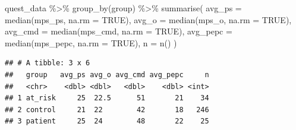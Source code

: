 \documentclass[
]{article}
\newenvironment{Shaded}{\begin{snugshade}}{\end{snugshade}}
\newcommand{\AttributeTok}[1]{\textcolor[rgb]{0.77,0.63,0.00}{#1}}
\newcommand{\ConstantTok}[1]{\textcolor[rgb]{0.00,0.00,0.00}{#1}}
\newcommand{\FunctionTok}[1]{\textcolor[rgb]{0.00,0.00,0.00}{#1}}
\newcommand{\NormalTok}[1]{#1}
\newcommand{\OtherTok}[1]{\textcolor[rgb]{0.56,0.35,0.01}{#1}}
\newcommand{\SpecialCharTok}[1]{\textcolor[rgb]{0.00,0.00,0.00}{#1}}
\newcommand{\StringTok}[1]{\textcolor[rgb]{0.31,0.60,0.02}{#1}}
\begin{document}
\begin{Shaded}
\begin{Highlighting}[]
\NormalTok{quest\_data }\SpecialCharTok{\%\textgreater{}\%} 
  \FunctionTok{group\_by}\NormalTok{(group) }\SpecialCharTok{\%\textgreater{}\%} 
  \FunctionTok{summarise}\NormalTok{(}
    \AttributeTok{avg\_ps =} \FunctionTok{median}\NormalTok{(mps\_ps, }\AttributeTok{na.rm =} \ConstantTok{TRUE}\NormalTok{), }
    \AttributeTok{avg\_o  =} \FunctionTok{median}\NormalTok{(mps\_o, }\AttributeTok{na.rm =} \ConstantTok{TRUE}\NormalTok{), }
    \AttributeTok{avg\_cmd  =} \FunctionTok{median}\NormalTok{(mps\_cmd, }\AttributeTok{na.rm =} \ConstantTok{TRUE}\NormalTok{),}
    \AttributeTok{avg\_pepc  =} \FunctionTok{median}\NormalTok{(mps\_pepc, }\AttributeTok{na.rm =} \ConstantTok{TRUE}\NormalTok{),}
    \AttributeTok{n =} \FunctionTok{n}\NormalTok{()}
\NormalTok{  )}
\end{Highlighting}
\end{Shaded}

\begin{verbatim}
## # A tibble: 3 x 6
##   group   avg_ps avg_o avg_cmd avg_pepc     n
##   <chr>    <dbl> <dbl>   <dbl>    <dbl> <int>
## 1 at_risk     25  22.5      51       21    34
## 2 control     21  22        42       18   246
## 3 patient     25  24        48       22    25
\end{verbatim}

\begin{Shaded}
\end{Shaded}
\end{document}
